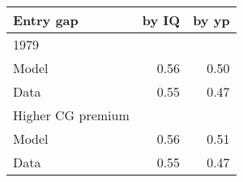 \begin{tabular}{lrr}
\hline
Entry gap & by IQ  & by yp  \\ 
\hline
1979 &   &   \\ 
Model & 0.56  & 0.50  \\ 
Data & 0.55  & 0.47  \\ 
Higher CG premium &   &   \\ 
Model & 0.56  & 0.51  \\ 
Data & 0.55  & 0.47  \\ 
\hline
\end{tabular}%
